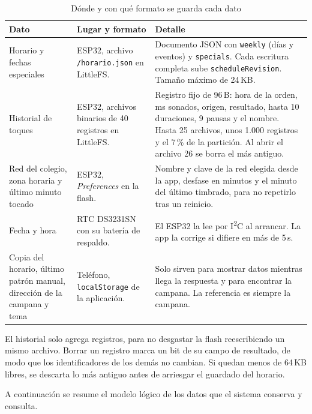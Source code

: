 \documentclass[a4paper,11pt]{article}
\newcommand{\senal}[1]{\texttt{#1}}
\begin{document}
\begin{table}[H]
\centering\small
\caption{Dónde y con qué formato se guarda cada dato}
\label{tab:persistencia}
\begin{tabularx}{\linewidth}{@{}P{2.9cm}P{3.6cm}Y@{}}
\toprule
\textbf{Dato} & \textbf{Lugar y formato} & \textbf{Detalle} \\
\midrule
Horario y fechas especiales & ESP32, archivo \senal{/horario.json} en LittleFS. & Documento JSON con \senal{weekly} (días y eventos) y \senal{specials}. Cada escritura completa sube \senal{scheduleRevision}. Tamaño máximo de 24\,KB. \\
Historial de toques & ESP32, archivos binarios de 40 registros en LittleFS. & Registro fijo de 96\,B: hora de la orden, ms sonados, origen, resultado, hasta 10 duraciones, 9 pausas y el nombre. Hasta 25 archivos, unos 1.000 registros y el 7\,\% de la partición. Al abrir el archivo 26 se borra el más antiguo. \\
Red del colegio, zona horaria y último minuto tocado & ESP32, \textit{Preferences} en la flash. & Nombre y clave de la red elegida desde la app, desfase en minutos y el minuto del último timbrado, para no repetirlo tras un reinicio. \\
Fecha y hora & RTC DS3231SN con su batería de respaldo. & El ESP32 la lee por I\textsuperscript{2}C al arrancar. La app la corrige si difiere en más de 5\,s. \\
Copia del horario, último patrón manual, dirección de la campana y tema & Teléfono, \senal{localStorage} de la aplicación. & Solo sirven para mostrar datos mientras llega la respuesta y para encontrar la campana. La referencia es siempre la campana. \\
\bottomrule
\end{tabularx}
\end{table}

El historial solo agrega registros, para no desgastar la flash reescribiendo un mismo archivo. Borrar un registro marca un bit de su campo de resultado, de modo que los identificadores de los demás no cambian. Si quedan menos de 64\,KB libres, se descarta lo más antiguo antes de arriesgar el guardado del horario.

A continuación se resume el modelo lógico de los datos que el sistema conserva y consulta.
\end{document}
